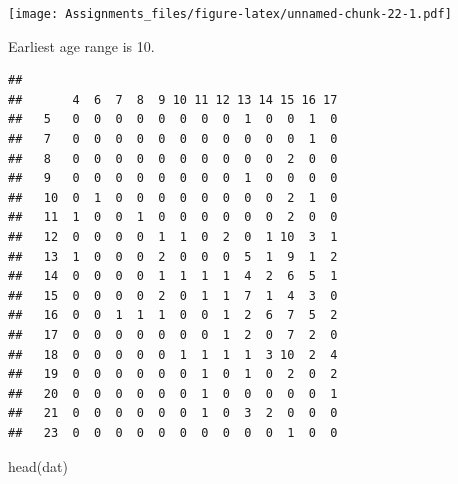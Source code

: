 \documentclass[
]{article}
\newenvironment{Shaded}{\begin{snugshade}}{\end{snugshade}}
\newcommand{\AttributeTok}[1]{\textcolor[rgb]{0.77,0.63,0.00}{#1}}
\newcommand{\CommentTok}[1]{\textcolor[rgb]{0.56,0.35,0.01}{\textit{#1}}}
\newcommand{\ConstantTok}[1]{\textcolor[rgb]{0.00,0.00,0.00}{#1}}
\newcommand{\FunctionTok}[1]{\textcolor[rgb]{0.00,0.00,0.00}{#1}}
\newcommand{\NormalTok}[1]{#1}
\newcommand{\OtherTok}[1]{\textcolor[rgb]{0.56,0.35,0.01}{#1}}
\newcommand{\SpecialCharTok}[1]{\textcolor[rgb]{0.00,0.00,0.00}{#1}}
\newcommand{\StringTok}[1]{\textcolor[rgb]{0.31,0.60,0.02}{#1}}
\begin{document}
\begin{Shaded}
\end{Shaded}

\texttt{[image: Assignments\_files/figure-latex/unnamed-chunk-22-1.pdf]}

Earliest age range is 10.

\begin{Shaded}
\end{Shaded}

\begin{verbatim}
##     
##       4  6  7  8  9 10 11 12 13 14 15 16 17
##   5   0  0  0  0  0  0  0  0  1  0  0  1  0
##   7   0  0  0  0  0  0  0  0  0  0  0  1  0
##   8   0  0  0  0  0  0  0  0  0  0  2  0  0
##   9   0  0  0  0  0  0  0  0  1  0  0  0  0
##   10  0  1  0  0  0  0  0  0  0  0  2  1  0
##   11  1  0  0  1  0  0  0  0  0  0  2  0  0
##   12  0  0  0  0  1  1  0  2  0  1 10  3  1
##   13  1  0  0  0  2  0  0  0  5  1  9  1  2
##   14  0  0  0  0  1  1  1  1  4  2  6  5  1
##   15  0  0  0  0  2  0  1  1  7  1  4  3  0
##   16  0  0  1  1  1  0  0  1  2  6  7  5  2
##   17  0  0  0  0  0  0  0  1  2  0  7  2  0
##   18  0  0  0  0  0  1  1  1  1  3 10  2  4
##   19  0  0  0  0  0  0  1  0  1  0  2  0  2
##   20  0  0  0  0  0  0  1  0  0  0  0  0  1
##   21  0  0  0  0  0  0  1  0  3  2  0  0  0
##   23  0  0  0  0  0  0  0  0  0  0  1  0  0
\end{verbatim}

\begin{Shaded}
\begin{Highlighting}[]
\FunctionTok{head}\NormalTok{(dat)}
\end{Highlighting}
\end{Shaded}
\end{document}
